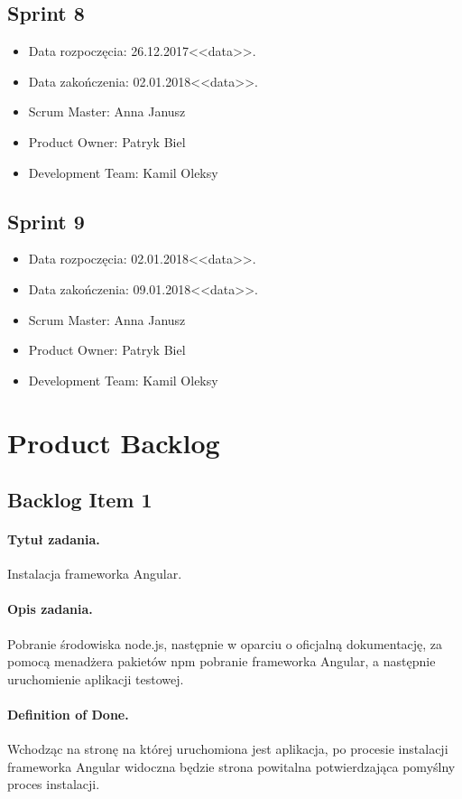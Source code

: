 \documentclass[a4paper]{article}
\begin{document}
\subsection{Sprint 8}

\begin{itemize}
\item Data rozpoczęcia: 26.12.2017<<data>>.
\item  Data zakończenia: 02.01.2018<<data>>.
\item Scrum Master: Anna Janusz
\item Product Owner: Patryk Biel
\item Development Team: Kamil Oleksy
\end{itemize}


\subsection{Sprint 9}

\begin{itemize}
\item Data rozpoczęcia: 02.01.2018<<data>>.
\item  Data zakończenia: 09.01.2018<<data>>.
\item Scrum Master: Anna Janusz
\item Product Owner: Patryk Biel
\item Development Team: Kamil Oleksy
\end{itemize}

\newpage
\section{Product Backlog}

\subsection{Backlog Item 1} 
\paragraph{Tytuł zadania.} Instalacja frameworka Angular.
\paragraph{Opis zadania.} Pobranie środowiska node.js, następnie w oparciu o oficjalną dokumentację, za pomocą menadżera pakietów npm pobranie frameworka Angular, a następnie uruchomienie aplikacji testowej. 
\paragraph{Definition of Done.} Wchodząc na stronę na której uruchomiona jest aplikacja, po procesie instalacji frameworka Angular widoczna będzie strona powitalna potwierdzająca pomyślny proces instalacji.
\end{document}

